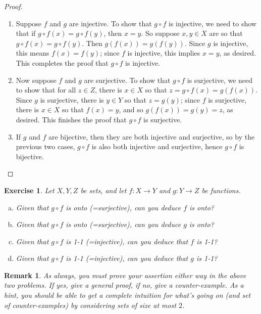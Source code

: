 \documentclass[a4paper,12pt,dvipsnames]{book}
\newtheorem{remark}{Remark}
\newtheorem{exercise}{Exercise}
\numberwithin{theorem}{chapter}
\theoremstyle{remark}
\begin{document}
\begin{proof}
\begin{enumerate}
\item Suppose $f$ and $g$ are injective. To show that $g\circ f$ is injective, we need to show that if $g\circ f(x)=g\circ f(y)$, then $x=y$. So suppose $x,y\in X$ are so that $g\circ f(x)=g\circ f(y)$. Then $g(f(x))=g(f(y))$. Since $g$ is injective, this means $f(x)=f(y)$; since $f$ is injective, this implies $x=y$, as desired. This completes the proof that $g\circ f$ is injective.
\item Now suppose $f$ and $g$ are surjective. To show that $g\circ f$ is surjective, we need to show that for all $z\in Z$, there is $x\in X$ so that $z=g\circ f(x)=g(f(x))$. Since $g$ is surjective, there is $y\in Y$ so that $z=g(y)$; since $f$ is surjective, there is $x\in X$ so that $f(x)=y$, and so $g(f(x))=g(y)=z$, as desired. This finishes the proof that $g\circ f$ is surjective. 
\item If $g$ and $f$ are bijective, then they are both injective and surjective, so by the previous two cases, $g\circ f$ is also both injective and surjective, hence $g\circ f$ is bijective. 
\end{enumerate}
\end{proof}



\begin{exercise}
Let $X,Y,Z$ be sets, and let $f:X\to Y$ and $g:Y\to Z$ be functions.

\begin{enumerate}[(a)]
\item Given that $g\circ f$ is onto (=surjective), can you deduce $f$ is onto?

\item Given that $g\circ f$ is onto (=surjective), can you deduce $g$ is onto?

\item Given that $g\circ f$ is 1-1 (=injective), can you deduce that $f$ is 1-1?

\item Given that $g\circ f$ is 1-1 (=injective), can you deduce that $g$ is 1-1?
\end{enumerate}
\end{exercise}

\begin{remark} As always, you must prove your assertion either way in the above two problems.  If yes, give a general proof, if no, give a counter-example. As a hint, you should be able to get a complete intuition for what's going on (and set of counter-examples) by considering sets of size at most $2$.\end{remark}
\end{document}

